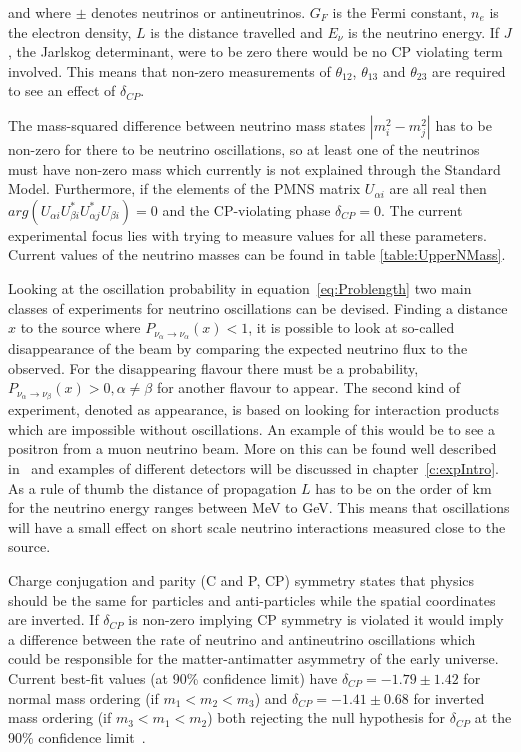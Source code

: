 and where $\pm$ denotes neutrinos or antineutrinos. $G_F$ is the Fermi constant, $n_e$ is the electron density, $L$ is the distance travelled and $E_\nu$ is the neutrino energy. If $J$, the Jarlskog determinant, were to be zero there would be no CP violating term involved. This means that non-zero measurements of $\theta_{12}$, $\theta_{13}$ and $\theta_{23}$ are required to see an effect of $\delta_{CP}$. 

The mass-squared difference between neutrino mass states $\left|m_i^2 - m_j^2\right|$ has to be non-zero for there to be neutrino oscillations, so at least one of the neutrinos must have non-zero mass which currently is not explained through the Standard Model. Furthermore, if the elements of the PMNS matrix $U_{\alpha i}$ are all real then $arg(U_{\alpha i} U^*_{\beta i} U^*_{\alpha j}  U_{\beta i} ) = 0$ and the CP-violating phase $\delta_{CP} =0$. The current experimental focus lies with trying to measure values for all these parameters. Current values of the neutrino masses can be found in table \ref{table:UpperNMass}.

Looking at the oscillation probability in equation~\eqref{eq:Problength} two main classes of experiments for neutrino oscillations can be devised. Finding a distance $x$ to the source where $P_{\nu_\alpha \rightarrow \nu_\alpha} (x) < 1$, it is possible to look at so-called disappearance of the beam by comparing the expected neutrino flux to the observed. For the disappearing flavour there must be a probability, $P_{\nu_\alpha \rightarrow \nu_\beta} (x) > 0, \alpha \neq \beta$ for another flavour to appear. The second kind of experiment, denoted as appearance, is based on looking for interaction products which are impossible without oscillations.  An example of this would be to see a positron from a muon neutrino beam. More on this can be found well described in~\cite{34doi:10.1142/9789812562203_0002} and examples of different detectors will be discussed in chapter~\ref{c:expIntro}. As a rule of thumb the distance of propagation $L$ has to be on the order of km for the neutrino energy ranges between MeV to GeV. This means that oscillations will have a small effect on short scale neutrino interactions measured close to the source.

Charge conjugation and parity (C and P, CP) symmetry states that physics should be the same for particles and anti-particles while the spatial coordinates are inverted. If $\delta_{CP}$ is non-zero implying CP symmetry is violated it would imply a difference between the rate of neutrino and antineutrino oscillations which could be responsible for the matter-antimatter asymmetry of the early universe. Current best-fit values (at 90\% confidence limit) have $\delta_{CP} = -1.79\pm 1.42$ for normal mass ordering (if $m_1 < m_2 < m_3$) and $\delta_{CP} = -1.41\pm 0.68$ for inverted mass ordering (if $m_3 < m_1 < m_2$) both rejecting the null hypothesis for $\delta_{CP}$ at the 90\% confidence limit~\cite{T2KResults}.

